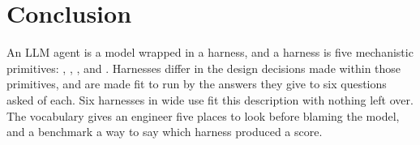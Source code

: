 \section{Conclusion}
An LLM agent is a model wrapped in a harness, and a harness is five mechanistic primitives: , , ,  and . Harnesses differ in the design decisions made within those primitives, and are made fit to run by the answers they give to six questions asked of each. Six harnesses in wide use fit this description with nothing left over. The vocabulary gives an engineer five places to look before blaming the model, and a benchmark a way to say which harness produced a score.
